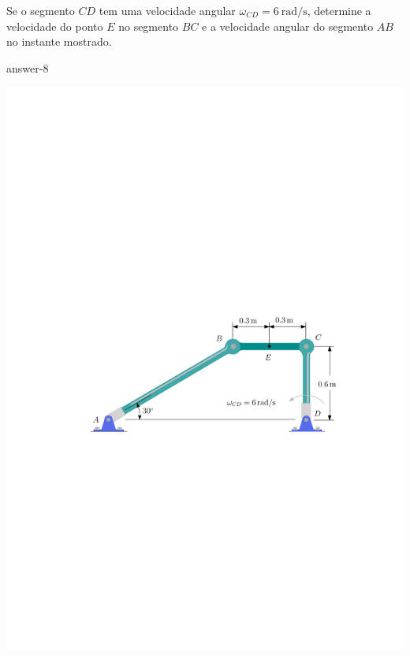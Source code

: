 \item Se o segmento $CD$ tem uma velocidade angular $\omega_{CD}=\SI{6}{\radian/\second}$, determine a velocidade do ponto $E$ no segmento $BC$ e a velocidade angular do segmento $AB$ no instante mostrado.

{answer-8}

\vspace{-2.2cm}
\begin{flushright}
	\includegraphics[scale=1]{images/draw_10}
\end{flushright}